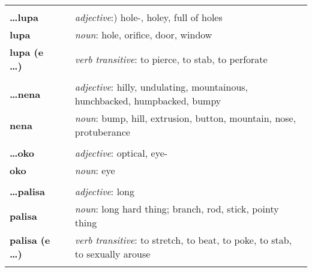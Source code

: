 \begin{supertabular}{p{2,5cm}|ll}
                              &  &                                                                                             \\
    \textbf{\dots lupa}       &  & \textit{adjective}:) hole-, holey, full of holes                                            \\
    \textbf{lupa}             &  & \textit{noun}: hole, orifice, door, window                                                  \\
    \textbf{lupa (e \dots)}   &  & \textit{verb transitive}: to pierce, to stab, to perforate                                  \\
                              &  &                                                                                             \\
    \textbf{\dots nena}       &  & \textit{adjective}: hilly, undulating, mountainous, hunchbacked, humpbacked, bumpy          \\
    \textbf{nena}             &  & \textit{noun}: bump, hill, extrusion, button, mountain, nose, protuberance                  \\
                              &  &                                                                                             \\
    \textbf{\dots oko}        &  & \textit{adjective}: optical, eye-                                                           \\
    \textbf{oko}              &  & \textit{noun}: eye                                                                          \\
                              &  &                                                                                             \\
    \textbf{\dots palisa}     &  & \textit{adjective}: long                                                                    \\
    \textbf{palisa}           &  & \textit{noun}: long hard thing; branch, rod, stick, pointy thing                            \\
    \textbf{palisa (e \dots)} &  & \textit{verb transitive}: to stretch, to beat, to poke, to stab, to sexually arouse         \\
                              &  &                                                                                             \\

\end{supertabular}
